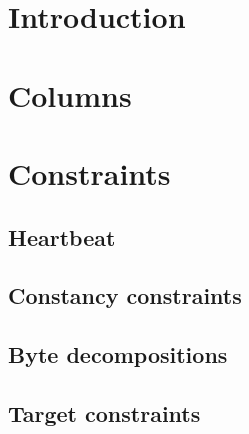 \section{Introduction}                       \label{gas: purpose}                      
\section{Columns}                            \label{gas: columns}                      
\section{Constraints}                              
\subsection{Heartbeat}                       \label{gas: heartbeat}                    
\subsection{Constancy constraints}           \label{gas: constancies}                  
\subsection{Byte decompositions}             \label{gas: byte decompositions}          
\subsection{Target constraints}              \label{gas: target constraints}           
